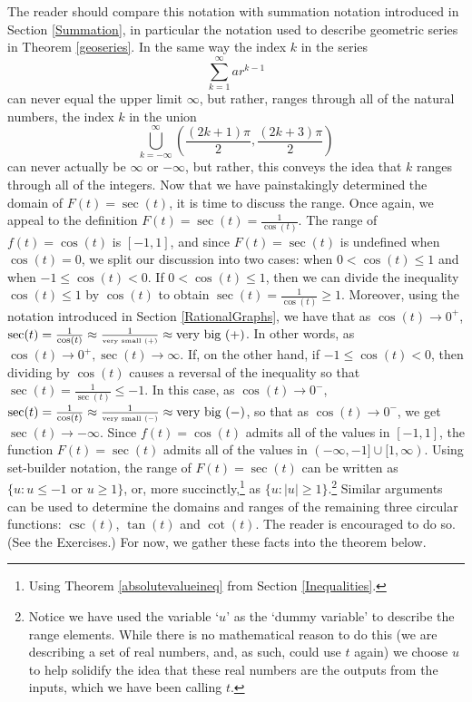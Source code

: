The reader should compare this notation with summation notation introduced in Section \ref{Summation}, in particular the notation used to describe geometric series in Theorem \ref{geoseries}.  In the same way the index $k$ in the series \[\displaystyle{\sum_{k = 1}^{\infty} a r^{k-1}}\] can never equal the upper limit $\infty$, but rather, ranges through all of the natural numbers, the index $k$ in the union \[\displaystyle{\bigcup_{k = -\infty}^{\infty} \left( \frac{(2k+1)\pi}{2}, \frac{(2k+3) \pi}{2} \right)}\] can never actually be $\infty$ or $-\infty$, but rather, this conveys the idea that $k$ ranges through all of the integers.  Now that we have painstakingly determined the domain of $F(t) = \sec(t)$, it is time to discuss the range.  Once again, we appeal to the definition $F(t) = \sec(t) = \frac{1}{\cos(t)}$.  The range of $f(t) = \cos(t)$ is $[-1,1]$, and since $F(t) = \sec(t)$ is  undefined when $\cos(t) = 0$, we split our discussion into two cases: when $0 < \cos(t) \leq 1$ and when $-1 \leq \cos(t) < 0$.  If $0 < \cos(t) \leq 1$, then we can divide the inequality $\cos(t) \leq 1$ by  $\cos(t)$ to obtain  $\sec(t) = \frac{1}{\cos(t)} \geq 1$.  Moreover, using the notation introduced in Section \ref{RationalGraphs}, we have that as  $\cos(t) \rightarrow 0^{+}$, $\sec(t)  = \frac{1}{\cos(t)} \approx \frac{1}{\mbox{\tiny very small $(+)$}} \approx \mbox{very big $(+)$}$.  In other words, as $\cos(t) \rightarrow 0^{+}, \sec(t) \rightarrow \infty$. If, on the other hand, if $-1 \leq \cos(t) < 0$, then dividing by $\cos(t)$ causes a reversal of the inequality so that $\sec(t) = \frac{1}{\sec(t)} \leq -1$.  In this case, as $\cos(t) \rightarrow 0^{-}$, $\sec(t)  = \frac{1}{\cos(t)} \approx \frac{1}{\mbox{\tiny very small $(-)$}} \approx \mbox{very big $(-)$}$, so that as $\cos(t) \rightarrow 0^{-}$, we get $\sec(t) \rightarrow -\infty$. Since $f(t) = \cos(t)$ admits all of the values in $[-1,1]$, the function $F(t) = \sec(t)$ admits all of the values in $(-\infty, -1] \cup [1,\infty)$.  Using set-builder notation, the range of $F(t) = \sec(t)$ can be written as $\{ u : \text{$u \leq -1$ or $u \geq 1$} \}$, or, more succinctly,\footnote{Using Theorem \ref{absolutevalueineq} from Section \ref{Inequalities}.} as  $\{ u :|u| \geq 1 \}$.\footnote{Notice we have used the variable `$u$' as the `dummy variable' to describe the range elements.  While there is no mathematical reason to do this (we are describing a set of real numbers, and, as such, could use $t$ again) we choose $u$ to help solidify the idea that these real numbers are the outputs from the inputs, which we have been calling $t$.}  Similar arguments can be used to determine the domains and ranges of the remaining three circular functions: $\csc(t)$, $\tan(t)$ and $\cot(t)$.  The reader is encouraged to do so.  (See the Exercises.)  For now, we gather these facts into the theorem below.

